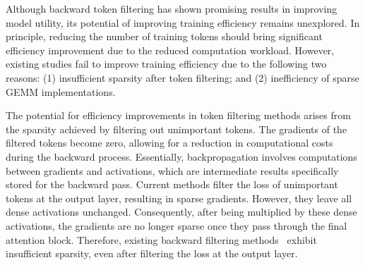 Although backward token filtering has shown promising results in improving model utility, its potential of improving training efficiency remains unexplored. In principle, reducing the number of training tokens should bring significant efficiency improvement due to the reduced computation workload. However, existing studies fail to improve training efficiency due to the following two reasons: (1) insufficient sparsity after token filtering; and (2) inefficiency of sparse GEMM implementations.

The potential for efficiency improvements in token filtering methods arises from the sparsity achieved by filtering out unimportant tokens. The gradients of the filtered tokens become zero, allowing for a reduction in computational costs during the backward process. Essentially, backpropagation involves computations between gradients and activations, which are intermediate results specifically stored for the backward pass.
Current methods filter the loss of unimportant tokens at the output layer, resulting in sparse gradients. However, they leave all dense activations unchanged. Consequently, after being multiplied by these dense activations, the gradients are no longer sparse once they pass through the final attention block. Therefore, existing backward filtering methods~\cite{RHO} exhibit insufficient sparsity, even after filtering the loss at the output layer.

